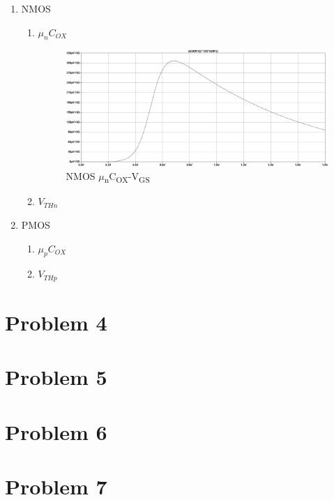 \documentclass{article}
\begin{document}
\begin{enumerate}
\begin{enumerate}
\item NMOS
\begin{enumerate}
\item \(\mu_{n}C_{OX}\)
\begin{figure}[H]
\centering
\includegraphics[width=.9\linewidth]{img/q3/b/nmos-ucox-vgs.pdf}
\caption{\label{fig:nmos-ucox-vgs}NMOS \(\mu\)\textsubscript{n}C\textsubscript{OX}-V\textsubscript{GS}}
\end{figure}
\item \(V_{THn}\)
\end{enumerate}
\item PMOS
\begin{enumerate}
\item \(\mu_{p}C_{OX}\)
\item \(V_{THp}\)
\end{enumerate}
\end{enumerate}
\end{enumerate}

\section{Problem 4}
\label{sec:orgaf4225b}
\section{Problem 5}
\label{sec:org7e27b86}
\section{Problem 6}
\label{sec:org6481c7a}
\section{Problem 7}
\label{sec:org42fc2a8}
\end{document}
